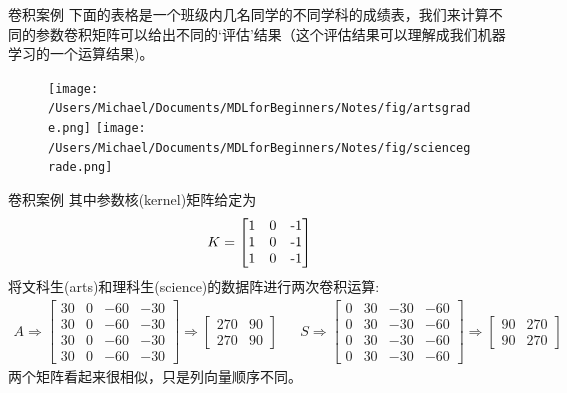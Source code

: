 \documentclass[handout]{beamer}
\begin{document}
\begin{frame}{卷积案例}
下面的表格是一个班级内几名同学的不同学科的成绩表，我们来计算不同的参数卷积矩阵可以给出不同的`评估'结果（这个评估结果可以理解成我们机器学习的一个运算结果)。
\begin{figure}[H]
	\centering
	\texttt{[image: /Users/Michael/Documents/MDLforBeginners/Notes/fig/artsgrade.png]}
	\texttt{[image: /Users/Michael/Documents/MDLforBeginners/Notes/fig/sciencegrade.png]}
\end{figure}
\end{frame}

\begin{frame}{卷积案例}
其中参数核(kernel)矩阵给定为
\begin{align*}
	K = \begin{bmatrix}
		1 & 0 & $-$1$$ \\
		1 & 0 & $-$1$$  \\
		1 & 0 & $-$1$$  
	\end{bmatrix}
\end{align*}
将文科生(arts)和理科生(science)的数据阵进行两次卷积运算:
{\footnotesize
\begin{align*}
	A \Rightarrow \begin{bmatrix}
		30 &    0  &   -60  &    -30 \\
       30  &     0  &    -60  &    -30   \\        
       30  &     0  &    -60  &   -30 \\
       30  &    0  &    -60  &   -30 
	\end{bmatrix} \Rightarrow \begin{bmatrix}
		270 & 90 \\
		270 & 90 
	\end{bmatrix} & & 	S \Rightarrow \begin{bmatrix}
	   0 & 30 & -30 & -60 \\
       0 & 30 &  -30 & -60 \\
        0 & 30 &  -30 & -60 \\
       0 & 30 &  -30 &  -60
	\end{bmatrix} \Rightarrow \begin{bmatrix}
		90 & 270 \\
		90 & 270 
	\end{bmatrix}
\end{align*}
}
两个矩阵看起来很相似，只是列向量顺序不同。
\end{frame}
\end{document}
